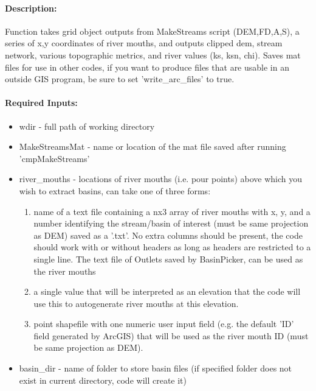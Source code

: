 \paragraph{Description:}
Function takes grid object outputs from MakeStreams script (DEM,FD,A,S), a series of x,y coordinates of river mouths,
and outputs clipped dem, stream network, various topographic metrics, and river values (ks, ksn, chi). Saves mat files
for use in other codes, if you want to produce files that are usable in an outside GIS program, be sure to set 
'write\_arc\_files' to true.

\paragraph{Required Inputs:}
\begin{itemize}
\item wdir - full path of working directory
\item MakeStreamsMat - name or location of the mat file saved after running 'cmpMakeStreams'
\item river\_mouths - locations of river mouths (i.e. pour points) above which you wish to extract basins, can take one of three forms:
\begin{enumerate}
\item name of a text file containing a nx3 array of river mouths with x, y, and a number identifying the stream/basin of interest 
(must be same projection as DEM) saved as a '.txt'. No extra columns should be present, the code should work with or without headers as 
long as headers are restricted to a single line. The text file of Outlets saved by BasinPicker, can be used as the river mouths
\item a single value that will be interpreted as an elevation that  the code will use this to autogenerate river mouths at this elevation.
\item point shapefile with one numeric user input field (e.g. the default 'ID' field generated by ArcGIS) that will be used as the
river mouth ID (must be same projection as DEM).
\end{enumerate}
\item basin\_dir - name of folder to store basin files (if specified folder does not exist in current directory, code will create it)
\end{itemize}

